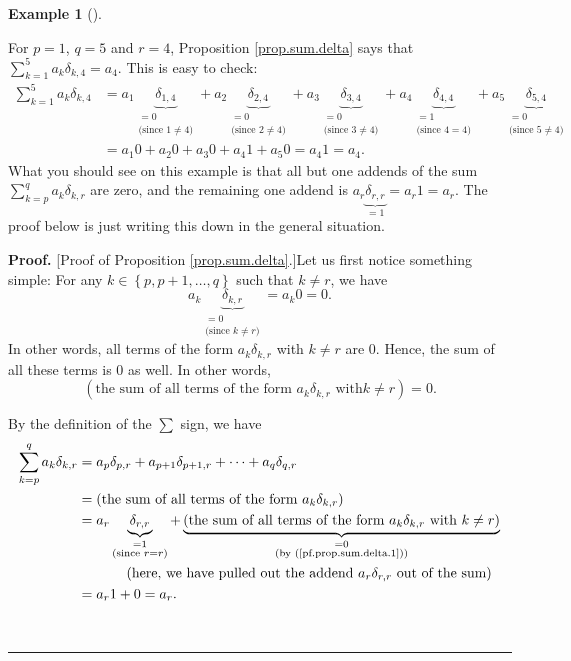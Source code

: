 \documentclass[numbers=enddot,12pt,final,onecolumn,notitlepage]{scrartcl}%
\theoremstyle{definition}
\newtheorem{exam}[theo]{Example}
\newenvironment{example}[1][]
{\begin{exam}[#1]\begin{leftbar}}
{\end{leftbar}\end{exam}}
\newenvironment{proof}[1][Proof]{\noindent\textbf{#1.} }{\ \rule{0.5em}{0.5em}}
\let\sumnonlimits\sum
\renewcommand{\sum}{\sumnonlimits\limits}
\begin{document}
\begin{example}
For $p=1$, $q=5$ and $r=4$, Proposition \ref{prop.sum.delta} says that
$\sum_{k=1}^{5}a_{k}\delta_{k,4}=a_{4}$. This is easy to check:%
\begin{align*}
\sum_{k=1}^{5}a_{k}\delta_{k,4}  &  =a_{1}\underbrace{\delta_{1,4}%
}_{\substack{=0\\\text{(since }1\neq4\text{)}}}+a_{2}\underbrace{\delta_{2,4}%
}_{\substack{=0\\\text{(since }2\neq4\text{)}}}+a_{3}\underbrace{\delta_{3,4}%
}_{\substack{=0\\\text{(since }3\neq4\text{)}}}+a_{4}\underbrace{\delta_{4,4}%
}_{\substack{=1\\\text{(since }4=4\text{)}}}+a_{5}\underbrace{\delta_{5,4}%
}_{\substack{=0\\\text{(since }5\neq4\text{)}}}\\
&  =a_{1}0+a_{2}0+a_{3}0+a_{4}1+a_{5}0=a_{4}1=a_{4}.
\end{align*}
What you should see on this example is that all but one addends of the sum
$\sum_{k=p}^{q}a_{k}\delta_{k,r}$ are zero, and the remaining one addend is
$a_{r}\underbrace{\delta_{r,r}}_{=1}=a_{r}1=a_{r}$. The proof below is just
writing this down in the general situation.
\end{example}

\begin{proof}
[Proof of Proposition \ref{prop.sum.delta}.]Let us first notice something
simple: For any $k\in\left\{  p,p+1,\ldots,q\right\}  $ such that $k\neq r$,
we have%
\[
a_{k}\underbrace{\delta_{k,r}}_{\substack{=0\\\text{(since }k\neq r\text{)}%
}}=a_{k}0=0.
\]
In other words, all terms of the form $a_{k}\delta_{k,r}$ with $k\neq r$ are
$0$. Hence, the sum of all these terms is $0$ as well. In other words,%
\begin{equation}
\left(  \text{the sum of all terms of the form }a_{k}\delta_{k,r}\text{ with
}k\neq r\right)  =0. \label{pf.prop.sum.delta.1}%
\end{equation}


By the definition of the $\sum$ sign, we have%
\begin{align*}
\sum_{k=p}^{q}a_{k}\delta_{k,r}  &  =a_{p}\delta_{p,r}+a_{p+1}\delta
_{p+1,r}+\cdots+a_{q}\delta_{q,r}\\
&  =\left(  \text{the sum of all terms of the form }a_{k}\delta_{k,r}\right)
\\
&  =a_{r}\underbrace{\delta_{r,r}}_{\substack{=1\\\text{(since }r=r\text{)}%
}}+\underbrace{\left(  \text{the sum of all terms of the form }a_{k}%
\delta_{k,r}\text{ with }k\neq r\right)  }_{\substack{=0\\\text{(by
(\ref{pf.prop.sum.delta.1}))}}}\\
&  \ \ \ \ \ \ \ \ \ \ \left(  \text{here, we have pulled out the addend
}a_{r}\delta_{r,r}\text{ out of the sum}\right) \\
&  =a_{r}1+0=a_{r}.
\end{align*}

\end{proof}
\end{document}
